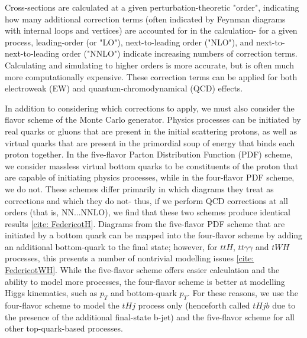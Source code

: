 Cross-sections are calculated at a given perturbation-theoretic "order", indicating how many additional correction terms (often indicated by Feynman diagrams with internal loops and vertices) are accounted for in the calculation- for a given process, leading-order (or "LO"), next-to-leading order ("NLO"), and next-to-next-to-leading order ("NNLO") indicate increasing numbers of correction terms. Calculating and simulating to higher orders is more accurate, but is often much more computationally expensive. These correction terms can be applied for both electroweak (EW) and quantum-chromodynamical (QCD) effects.

In addition to considering which corrections to apply, we must also consider the flavor scheme of the Monte Carlo generator. Physics processes can be initiated by real quarks or gluons that are present in the initial scattering protons, as well as virtual quarks that are present in the primordial soup of energy that binds each proton together. In the five-flavor Parton Distribution Function (PDF) scheme, we consider massless virtual bottom quarks to be constituents of the proton that are capable of initiating physics processes, while in the four-flavor PDF scheme, we do not. These schemes differ primarily in which diagrams they treat as corrections and which they do not- thus, if we perform QCD corrections at all orders (that is, NN...NNLO), we find that these two schemes produce identical results \ref{cite: FedericotH}. Diagrams from the five-flavor PDF scheme that are initiated by a bottom quark can be mapped into the four-flavor scheme by adding an additional bottom-quark to the final state; however, for $ttH$, $tt\gamma\gamma$ and $tWH$ processes, this presents a number of nontrivial modelling issues \ref{cite: FedericotWH}. While the five-flavor scheme offers easier calculation and the ability to model more processes, the four-flavor scheme is better at modelling Higgs kinematics, such as $p_{T}$ and bottom-quark  $p_{T}$. For these reasons, we use the four-flavor scheme to model the $tHj$ process only (henceforth called $tHjb$ due to the presence of the additional final-state b-jet) and the five-flavor scheme for all other top-quark-based processes. 

